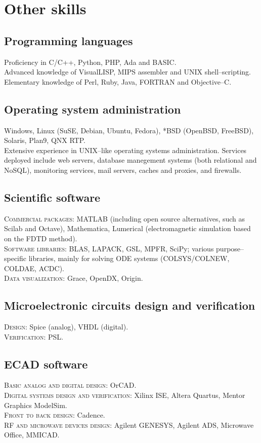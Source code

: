 \documentclass[11pt, a4paper]{article}
\begin{document}
\section*{Other skills} %
\subsection*{Programming languages}
\noindent
	Proficiency in C/C++, Python, PHP, Ada and BASIC.\\
	Advanced knowledge of VisualLISP, MIPS assembler and UNIX shell--scripting.\\
	Elementary knowledge of Perl, Ruby, Java, FORTRAN and Objective--C.
\subsection*{Operating system administration}
\noindent
	Windows, Linux (SuSE, Debian, Ubuntu, Fedora), *BSD (OpenBSD, FreeBSD), Solaris, Plan9, QNX RTP.\\
	Extensive experience in UNIX--like operating systems administration. Services deployed include web servers, database manegement systems (both relational and NoSQL), monitoring services, mail servers, caches and proxies, and firewalls.
\subsection*{Scientific software}
\noindent
	\textsc{Commercial packages}: MATLAB (including open source alternatives, such as Scilab and Octave), Mathematica, Lumerical (electromagnetic simulation based on the FDTD method).\\
	\textsc{Software libraries}: BLAS, LAPACK, GSL, MPFR, SciPy; various purpose--specific libraries, mainly for solving ODE systems (COLSYS/COLNEW, COLDAE, ACDC).\\
	\textsc{Data visualization}: Grace, OpenDX, Origin.
\subsection*{Microelectronic circuits design and verification}
\noindent
	\textsc{Design}: Spice (analog), VHDL (digital).\\
	\textsc{Verification}: PSL.
\subsection*{ECAD software}
\noindent
	\textsc{Basic analog and digital design}: OrCAD.\\
	\textsc{Digital systems design and verification}: Xilinx ISE, Altera Quartus, Mentor Graphics ModelSim.\\
	\textsc{Front to back design}: Cadence.\\
	\textsc{RF and microwave devices design}: Agilent GENESYS, Agilent ADS, Microwave Office, MMICAD.
\end{document}
